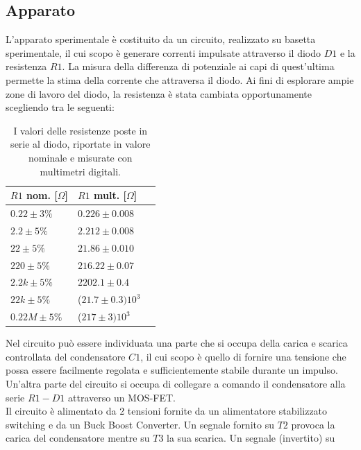 \documentclass{article}[a4paper, oneside, 11pt]
\begin{document}
\subsection{Apparato}
L'apparato sperimentale è costituito da un circuito, realizzato su basetta 
sperimentale, il cui scopo è generare correnti impulsate attraverso il diodo 
$D1$ e la resistenza $R1$. La misura della differenza di potenziale ai capi di quest'ultima
permette la stima della corrente che attraversa il diodo. Ai fini di esplorare ampie zone 
di lavoro del diodo, la resistenza è stata cambiata opportunamente scegliendo tra le seguenti:
\begin{table}[H]
    \begin{center}
	\begin{tabular}{lll}
	    \toprule
	    $R1$ nom. [$\Omega$] & $R1$ mult. [$\Omega$] \\ 
	    \midrule
	    \midrule
	    $0.22 \pm 3 \% $         & $0.226 \pm 0.008$ \\
	    $2.2 \pm 5 \% $          & $2.212 \pm 0.008$ \\
	    $22 \pm 5 \% $           & $21.86 \pm 0.010$ \\ 
	    $220 \pm 5 \% $          & $216.22 \pm 0.07$ \\
	    $2.2 k \pm 5 \% $        & $2202.1 \pm 0.4$ \\
	    $22 k \pm 5 \% $         & ($21.7 \pm 0.3)10^3$ \\
	    $0.22 M \pm 5 \% $        & ($217 \pm 3)10^3$ \\
	    \bottomrule
	\end{tabular}
	\caption{I valori delle resistenze poste in serie al diodo, riportate in
		valore nominale e misurate con multimetri digitali. \label{tab: res}}
    \end{center}
\end{table}
Nel circuito può essere individuata una parte che si occupa della carica e 
scarica controllata del condensatore $C1$, il cui scopo è quello di fornire una 
tensione che possa essere facilmente regolata e sufficientemente stabile 
durante un impulso. Un'altra parte del circuito si occupa di collegare a 
comando il condensatore alla serie $R1-D1$ attraverso un MOS-FET.\\
Il circuito è alimentato da 2 tensioni fornite da un alimentatore stabilizzato 
switching e da un Buck Boost Converter. Un segnale fornito su $T2$ provoca la 
carica del condensatore mentre su $T3$ la sua scarica. Un segnale (invertito) su 
\end{document}
